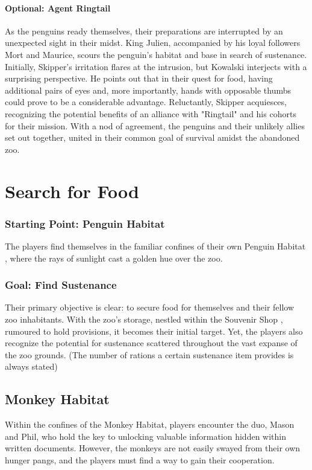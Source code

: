 \paragraph*{Optional: Agent Ringtail}
As the penguins ready themselves, their preparations are interrupted by an unexpected sight in their midst. King Julien, accompanied by his loyal followers Mort and Maurice, scours the penguin's habitat and base in search of sustenance. Initially, Skipper's irritation flares at the intrusion, but Kowalski interjects with a surprising perspective. He points out that in their quest for food, having additional pairs of eyes and, more importantly, hands with opposable thumbs could prove to be a considerable advantage. Reluctantly, Skipper acquiesces, recognizing the potential benefits of an alliance with "Ringtail" and his cohorts for their mission. With a nod of agreement, the penguins and their unlikely allies set out together, united in their common goal of survival amidst the abandoned zoo.\\\hfill

\section*{Search for Food}
\subsubsection*{Starting Point: Penguin Habitat}
The players find themselves in the familiar confines of their own Penguin Habitat , where the rays of sunlight cast a golden hue over the zoo.
\subsubsection*{Goal: Find Sustenance}
Their primary objective is clear: to secure food for themselves and their fellow zoo inhabitants. With the zoo's storage, nestled within the Souvenir Shop , rumoured to hold provisions, it becomes their initial target. Yet, the players also recognize the potential for sustenance scattered throughout the vast expanse of the zoo grounds. (The number of rations a certain sustenance item provides is always stated)
\subsection*{ Monkey Habitat}
Within the confines of the Monkey Habitat, players encounter the duo, Mason and Phil, who hold the key to unlocking valuable information hidden within written documents. However, the monkeys are not easily swayed from their own hunger pangs, and the players must find a way to gain their cooperation.

